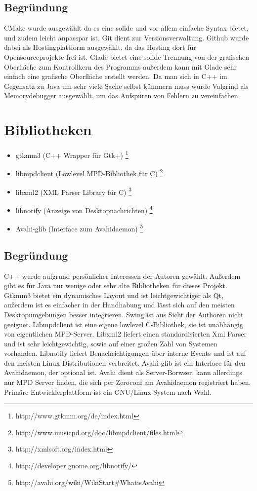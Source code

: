 \subsection{Begründung}
CMake wurde ausgewählt da es eine solide und vor allem einfache Syntax bietet, und zudem leicht anpasspar ist. 
Git dient zur Versionsverwaltung. Github wurde dabei als Hostingplattform ausgewählt, da das Hosting dort für Opensourceprojekte
frei ist.  Glade bietet eine solide Trennung von der grafischen  Oberfläche zum Kontrollkern des Programms außerdem kann mit Glade sehr
einfach eine grafische Oberfläche erstellt werden. Da man sich in C++ im Gegensatz zu Java um sehr viele Sache selbst kümmern muss
wurde Valgrind als Memorydebugger ausgewählt, um das Aufspüren von Fehlern zu vereinfachen.
\section{Bibliotheken}
\begin{itemize}
\item gtkmm3 (C++ Wrapper für Gtk+) \footnote{http://www.gtkmm.org/de/index.html}
\item libmpdclient (Lowlevel MPD-Bibliothek für C) \footnote{http://www.musicpd.org/doc/libmpdclient/files.html}
\item libxml2 (XML Parser Library für C) \footnote{http://xmlsoft.org/index.html}
\item libnotify (Anzeige von Desktopnachrichten) \footnote{http://developer.gnome.org/libnotify/}
\item Avahi-glib (Interface zum Avahidaemon) \footnote{http://avahi.org/wiki/WikiStart\#WhatisAvahi}
\end{itemize}
\subsection{Begründung}
C++ wurde aufgrund persönlicher Interessen der Autoren gewählt. Außerdem gibt es für Java nur wenige
oder sehr alte Bibliotheken für dieses Projekt. Gtkmm3 bietet ein dynamisches Layout und ist
leichtgewichtiger als Qt, außerdem ist es einfacher in der Handhabung und lässt sich auf den meisten 
Desktopumgebungen besser integrieren. Swing ist aus Sicht der Authoren nicht geeignet.
Libmpdclient ist eine eigene lowlevel C-Bibliothek, sie ist unabhängig von eigentlichen MPD-Server.
Libxml2 liefert einen standardisierten Xml Parser und ist sehr leichtgewichtig, sowie auf einer großen Zahl von Systemen vorhanden.
Libnotify liefert Benachrichtigungen über interne Events und ist auf den meisten Linux
Distributionen verbreitet. Avahi-glib ist ein Interface für den Avahidaemon, der optional ist. Avahi 
dient als Server-Borwser, kann allerdings nur MPD Server finden, die sich per Zeroconf am Avahidaemon registriert
haben.
\\ 
Primäre Entwicklerplattform ist ein GNU/Linux-System nach Wahl.
